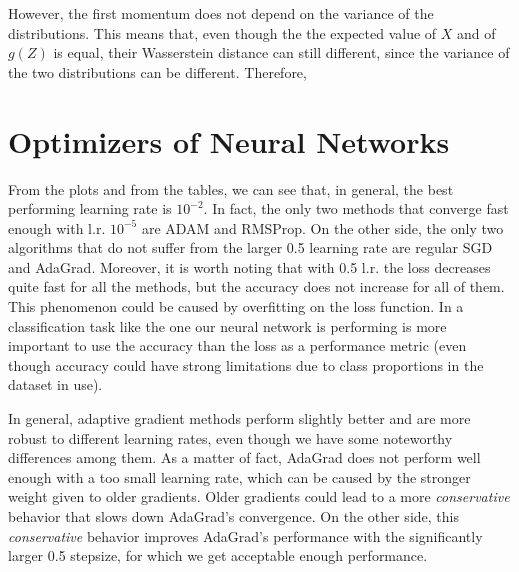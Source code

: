 \documentclass[12pt]{article}
\begin{document}
However, the first momentum does not depend on the variance of the distributions. This means that, even though the the expected value of $X$ and of $g(Z)$ is equal, their Wasserstein distance can still different, since the variance of the two distributions can be different. Therefore, 

\section{Optimizers of Neural Networks}

From the plots and from the tables, we can see that, in general, the best performing learning rate is $10^{-2}$. In fact, the only two methods that converge fast enough with l.r. $10^{-5}$ are ADAM and RMSProp. On the other side, the only two algorithms that do not suffer from the larger 0.5 learning rate are regular SGD and AdaGrad. Moreover, it is worth noting that with 0.5 l.r. the loss decreases quite fast for all the methods, but the accuracy does not increase for all of them. This phenomenon could be caused by overfitting on the loss function. In a classification task like the one our neural network is performing is more important to use the accuracy than the loss as a performance metric (even though accuracy could have strong limitations due to class proportions in the dataset in use).

In general, adaptive gradient methods perform slightly better and are more robust to different learning rates, even though we have some noteworthy differences among them. As a matter of fact, AdaGrad does not perform well enough with a too small learning rate, which can be caused by the stronger weight given to older gradients. Older gradients could lead to a more \textit{conservative} behavior that slows down AdaGrad's convergence. On the other side, this \textit{conservative} behavior improves AdaGrad's performance with the significantly larger 0.5 stepsize, for which we get acceptable enough performance.
\end{document}
